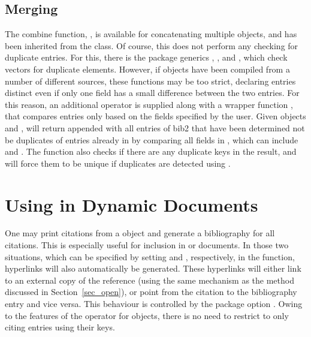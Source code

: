 \documentclass[article]{jss}\usepackage[]{graphicx}\usepackage[]{color}
\newcommand{\ourpkg}{\pkg{RefManageR}}
\newcommand{\bt}{\`{}}
\begin{document}
\subsection{Merging}
The combine function, , is available for concatenating multiple  objects, and has been inherited from the  class.  Of course, this does not perform any checking for duplicate entries.  For this, there is the  package generics , , and , which check vectors for duplicate elements.  However, if  objects have been compiled from a number of different sources, these functions may be too strict, declaring entries distinct even if only one field has a small difference between the two entries.  For this reason, an additional operator  is supplied along with a wrapper function , that compares entries only based on the fields specified by the user.  Given  objects  and ,  will return  appended with all entries of bib2 that have been determined not be duplicates of entries already in  by comparing all fields in , which can include  and .  The function also checks if there are any duplicate keys in the result, and will force them to be unique if duplicates are detected using . 

\section[Using RefManageR in Dynamic Documents]{Using \ourpkg{} in Dynamic Documents}\label{sec_cite}
One may print citations from a  object and generate a bibliography for all citations.  This is especially useful for inclusion in  or  documents.  In those two situations, which can be specified by setting  and , respectively, in the  function, hyperlinks will also automatically be generated.  These hyperlinks will either link to an external copy of the reference (using the same mechanism as the  method discussed in Section~\ref{sec_open}), or point from the citation to the bibliography entry and vice versa.  This behaviour is controlled by the package option .  Owing to the features of the \code{\bt[\bt} operator for  objects, there is no need to restrict to only citing entries using their keys.
\end{document}
